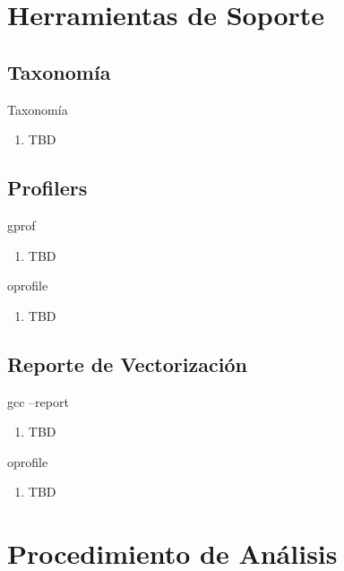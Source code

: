 \documentclass{beamer}
\begin{document}
\section{Herramientas de Soporte}

\subsection{Taxonomía}

\begin{frame}{Taxonomía}
	\begin{enumerate}
	\item TBD 
	\end{enumerate}
\end{frame}

\subsection{Profilers}

\begin{frame}{gprof}
	\begin{enumerate}
	\item TBD 
	\end{enumerate}
\end{frame}

\begin{frame}{oprofile}
	\begin{enumerate}
	\item TBD 
	\end{enumerate}
\end{frame}

\subsection{Reporte de Vectorización}

\begin{frame}{gcc --report}
	\begin{enumerate}
	\item TBD 
	\end{enumerate}
\end{frame}

\begin{frame}{oprofile}
	\begin{enumerate}
	\item TBD 
	\end{enumerate}
\end{frame}

\section{Procedimiento de Análisis}
\end{document}
